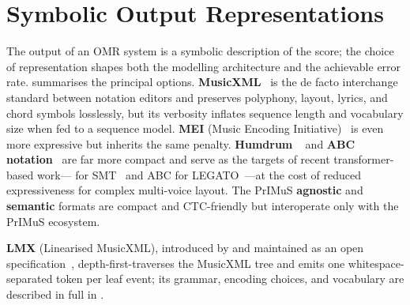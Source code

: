 \section{Symbolic Output Representations}
\label{sec:soa-representations}

The output of an OMR system is a symbolic description of the score; the
choice of representation shapes both the modelling architecture and the
achievable error rate.
 summarises the principal options.
\textbf{MusicXML}~\cite{goodMusicXML2001} is the de facto interchange
standard between notation editors and preserves polyphony, layout, lyrics,
and chord symbols losslessly, but its verbosity inflates sequence length
and vocabulary size when fed to a sequence model.
\textbf{MEI} (Music Encoding Initiative)~\cite{rolandMEI2002} is even more
expressive but inherits the same penalty.
\textbf{Humdrum} ~\cite{huronHumdrum2002} and
\textbf{ABC notation}~\cite{walshawABC2011} are far more compact and serve as
the targets of recent transformer-based work--- for
SMT~\cite{riosVilaSheetMusicTransformer2024} and ABC for
LEGATO~\cite{yangLEGATO2025}---at the cost of reduced expressiveness for
complex multi-voice layout.
The PrIMuS \textbf{agnostic} and \textbf{semantic} formats are compact and
CTC-friendly but interoperate only with the PrIMuS ecosystem.

\textbf{LMX} (Linearised MusicXML), introduced by
\textcite{mayerPracticalEndToEnd2024} and maintained as an open
specification~\cite{OMRResearchLmx2025}, depth-first-traverses the
MusicXML tree and emits one whitespace-separated token per leaf event;
its grammar, encoding choices, and vocabulary are described in full in
.

